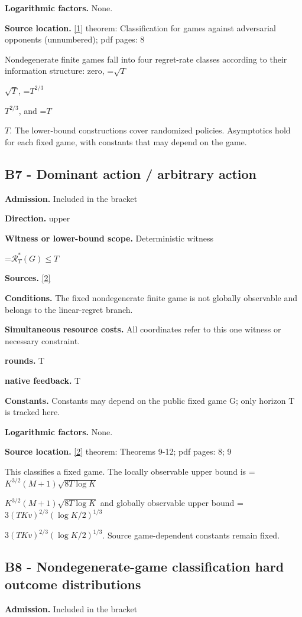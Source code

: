 \documentclass[10pt,a4paper]{article}
\newcommand{\AtlasMath}[1]{\par\begingroup\centering\setbox0=\hbox{$\displaystyle #1$}\ifdim\wd0>1.4\linewidth\typeout{ATLAS WIDE FORMULA: \the\wd0}\fi\ifdim\wd0>\linewidth\resizebox{\linewidth}{!}{\box0}\else\box0\fi\par\endgroup}
\newcommand{\AtlasInlineMath}[1]{\begingroup\setbox0=\hbox{$#1$}\ifdim\wd0>.4\linewidth\endgroup\AtlasMath{#1}\else\endgroup$#1$\fi}
\begin{document}
\textbf{Logarithmic factors.} None.

\textbf{Source location.} \href{https://sites.ualberta.ca/~szepesva/papers/partial_monitoring-mor.pdf}{[1]} theorem: Classification for games against adversarial opponents (unnumbered); pdf pages: 8

Nondegenerate finite games fall into four regret-rate classes according to their information structure: zero, \AtlasInlineMath{\sqrt T}, \AtlasInlineMath{T^{2/3}}, and \AtlasInlineMath{T}. The lower-bound constructions cover randomized policies. Asymptotics hold for each fixed game, with constants that may depend on the game.

\subsection{B7 - Dominant action / arbitrary action}
\textbf{Admission.} Included in the bracket

\textbf{Direction.} upper

\textbf{Witness or lower-bound scope.} Deterministic witness

\AtlasMath{\mathcal{R}_T^*(G)\le T}
\textbf{Sources.} \href{https://proceedings.mlr.press/v99/lattimore19a/lattimore19a.pdf}{[2]}

\textbf{Conditions.} The fixed nondegenerate finite game is not globally observable and belongs to the linear-regret branch.

\textbf{Simultaneous resource costs.} All coordinates refer to this one witness or necessary constraint.

\textbf{rounds.} T

\textbf{native feedback.} T

\textbf{Constants.} Constants may depend on the public fixed game G; only horizon T is tracked here.

\textbf{Logarithmic factors.} None.

\textbf{Source location.} \href{https://proceedings.mlr.press/v99/lattimore19a/lattimore19a.pdf}{[2]} theorem: Theorems 9-12; pdf pages: 8; 9

This classifies a fixed game. The locally observable upper bound is \AtlasInlineMath{K^{3/2}(M+1)\sqrt{8T\log K}} and globally observable upper bound \AtlasInlineMath{3(TKv)^{2/3}(\log K/2)^{1/3}}. Source game-dependent constants remain fixed.

\subsection{B8 - Nondegenerate-game classification hard outcome distributions}
\textbf{Admission.} Included in the bracket
\end{document}
